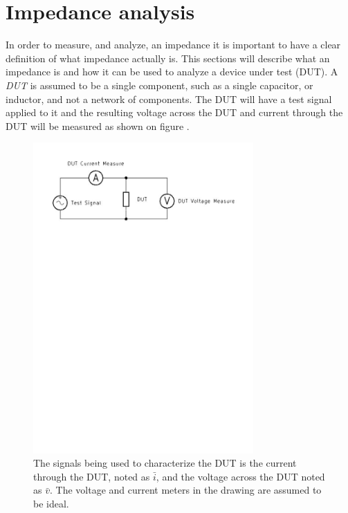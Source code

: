 \section{Impedance analysis} \label{sec:ImpedanceAnalysis}
In order to measure, and analyze, an impedance it is important to have a clear definition of what impedance actually is. This sections will describe what an impedance is and how it can be used to analyze a device under test (DUT). A \textit{DUT} is assumed to be a single component, such as a single capacitor, or inductor, and not a network of components. The DUT will have a test signal applied to it and the resulting voltage across the DUT and current through the DUT will be measured as shown on figure .

\begin{figure}[H]
    \centering
    \includegraphics[clip, trim=0 620 0 20, width=0.75\textwidth]{Sections/4_TechnicalAnalysis/Figures/4_1_Signals}
    \caption{The signals being used to characterize the DUT is the current through the DUT, noted as $\bar i$, and the voltage across the DUT noted as $\bar v$. The voltage and current meters in the drawing are assumed to be ideal.}
    \label{fig:4_1_Signals}
\end{figure}

